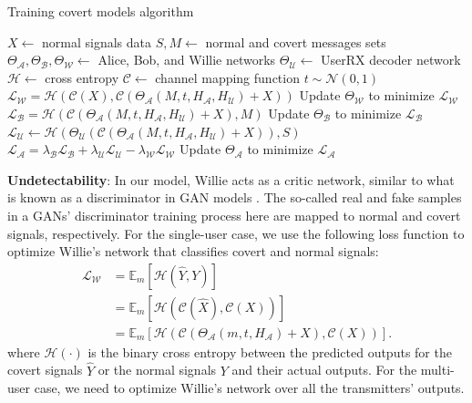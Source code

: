 \begin{algorithm}[tp!]
	\caption{Training covert models algorithm}\label{alg:train}
	\small
	\begin{algorithmic}
		\State $X \gets$ normal signals data
		\State $S, M \gets$ normal and covert messages sets
		\State $\Theta_{\mathcal{A}}, \Theta_{\mathcal{B}}, \Theta_{\mathcal{W}} \gets$ Alice, Bob, and Willie networks
		\State $\Theta_{\mathcal{U}} \gets$ UserRX decoder network
		\State $\mathcal{H} \gets$ cross entropy 
		\State $\mathcal{C} \gets$ channel mapping function
		\State $t \sim \mathcal{N}(0, 1)$
		\State $\mathcal{L}_{\mathcal{W}} = \mathcal{H}(\mathcal{C}(X), \mathcal{C}(\Theta_{\mathcal{A}}(M, t, H_{\mathcal{A}}, H_{\mathcal{U}}) + X))$
		\State Update $\Theta_{\mathcal{W}}$ to minimize $\mathcal{L}_{\mathcal{W}}$
		\State $\mathcal{L}_{\mathcal{B}} = \mathcal{H}(\mathcal{C}(\Theta_{\mathcal{A}}(M, t, H_{\mathcal{A}}, H_{\mathcal{U}}) + X), M)$
		\State Update $\Theta_{\mathcal{B}}$ to minimize $\mathcal{L}_{\mathcal{B}}$
		\State $\mathcal{L}_{\mathcal{U}} \gets \mathcal{H}(\Theta_{\mathcal{U}}(\mathcal{C}(\Theta_{\mathcal{A}}(M, t, H_{\mathcal{A}}, H_{\mathcal{U}}) + X)), S)$
		\State
		$\mathcal{L}_{\mathcal{A}} = \lambda_{\mathcal{B}} \mathcal{L}_{\mathcal{B}} + \lambda_{\mathcal{U}} \mathcal{L}_{\mathcal{U}} - \lambda_{\mathcal{W}} \mathcal{L}_{\mathcal{W}}$
		\State Update $\Theta_{\mathcal{A}}$ to minimize $\mathcal{L}_{\mathcal{A}}$
		\EndFor
	\end{algorithmic}
\end{algorithm}

\textbf{Undetectability}: In our model, Willie acts as a critic network, similar to what is known as a discriminator in GAN models \cite{goodfellow2014generative}. The so-called real and fake samples in a GANs' discriminator training process here are mapped to normal and covert signals, respectively. For the single-user case, we use the following loss function to optimize Willie's network that classifies covert and normal signals:
\begin{equation}
	\begin{aligned} \label{willie_loss}
	\mathcal{L}_{\mathcal{W}} & = \mathbb{E}_{m}[\mathcal{H}(\hat{Y}, Y)] \\
	& = \mathbb{E}_{m}[\mathcal{H}(\mathcal{C}(\hat{X}), \mathcal{C}(X))] \\
	& = \mathbb{E}_{m}[\mathcal{H}(\mathcal{C}(\Theta_{\mathcal{A}}(m, t, H_{\mathcal{A}}) + X), \mathcal{C}(X))].
	\end{aligned}
\end{equation}
where \(\mathcal{H}(\cdot)\) is the binary cross entropy between the predicted outputs for the covert signals \(\hat{Y}\) or the normal signals \(Y\) and their actual outputs. For the multi-user case, we need to optimize Willie's network over all the transmitters' outputs.

